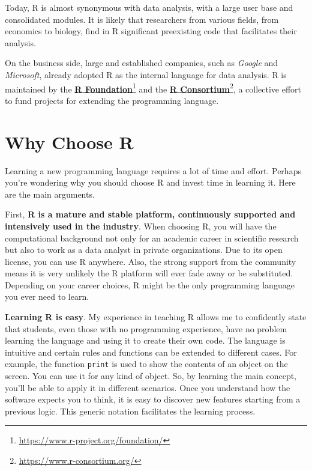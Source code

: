 \documentclass[
  12pt,
]{book}
\begin{document}
Today, R is almost synonymous with data analysis, with a large user base and consolidated modules. It is likely that researchers from various fields, from economics to biology, find in R significant preexisting code that facilitates their analysis.

On the business side, large and established companies, such as \emph{Google} and \emph{Microsoft}, already adopted R as the internal language for data analysis. R is maintained by the \href{https://www.r-project.org/foundation/}{\textbf{R Foundation}}\footnote{\url{https://www.r-project.org/foundation/}} and the \href{https://www.r-consortium.org/}{\textbf{R Consortium}}\footnote{\url{https://www.r-consortium.org/}}, a collective effort to fund projects for extending the programming language.  

\hypertarget{why-choose-r}{%
\section{Why Choose R}\label{why-choose-r}}

Learning a new programming language requires a lot of time and effort. Perhaps you're wondering why you should choose R and invest time in learning it. Here are the main arguments.

First, \textbf{R is a mature and stable platform, continuously supported and intensively used in the industry}. When choosing R, you will have the computational background not only for an academic career in scientific research but also to work as a data analyst in private organizations. Due to its open license, you can use R anywhere. Also, the strong support from the community means it is very unlikely the R platform will ever fade away or be substituted. Depending on your career choices, R might be the only programming language you ever need to learn.

\textbf{Learning R is easy}. My experience in teaching R allows me to confidently state that students, even those with no programming experience, have no problem learning the language and using it to create their own code. The language is intuitive and certain rules and functions can be extended to different cases. For example, the function \texttt{print} is used to show the contents of an object on the screen. You can use it for any kind of object. So, by learning the main concept, you'll be able to apply it in different scenarios. Once you understand how the software expects you to think, it is easy to discover new features starting from a previous logic. This generic notation facilitates the learning process.
\end{document}
